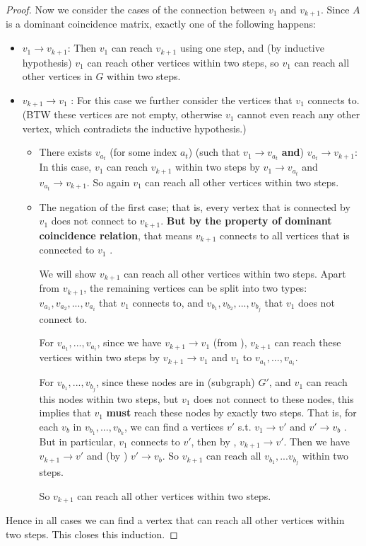 \begin{proof}
Now we consider the cases of the connection between \(v_1\) and \(v_{k + 1}\).
Since \(A\) is a dominant coincidence matrix, exactly one of the following happens:
\begin{itemize}
\item \(v_1 \to v_{k + 1}\):
    Then \(v_1\) can reach \(v_{k + 1}\) using one step, and (by inductive hypothesis) \(v_1\) can reach other vertices within two steps, so \(v_1\) can reach all other vertices in \(G\) within two steps.
\item \(v_{k + 1} \to v_1\) :
    For this case we further consider the vertices that \(v_1\) connects to.
    (BTW these vertices are not empty, otherwise \(v_1\) cannot even reach any other vertex, which contradicts the inductive hypothesis.)
    \begin{itemize}
    \item There exists \(v_{a_t}\) (for some index \(a_t\)) (such that \(v_1 \to v_{a_t}\) \textbf{and}) \(v_{a_t} \to v_{k + 1}\):
        In this case, \(v_1\) can reach \(v_{k + 1}\) within two steps by \(v_1 \to v_{a_t}\) and \(v_{a_t} \to v_{k + 1}\).
        So again \(v_1\) can reach all other vertices within two steps.
    \item The negation of the first case; that is, every vertex that is connected by \(v_1\) does not connect to \(v_{k + 1}\).
        \textbf{But by the property of dominant coincidence relation}, that means \(v_{k + 1}\) connects to all vertices that is connected to \(v_1\) .
        
        We will show \(v_{k + 1}\) can reach all other vertices within two steps.
        Apart from \(v_{k + 1}\), the remaining vertices can be split into two types: \(v_{a_1}, v_{a_2}, ..., v_{a_i}\) that \(v_1\) connects to, and \(v_{b_1}, v_{b_2}, ..., v_{b_j}\) that \(v_1\) does not connect to.
        
        For \(v_{a_1}, ..., v_{a_i}\), since we have \(v_{k + 1} \to v_1\) (from ), \(v_{k + 1}\) can reach these vertices within two steps by \(v_{k + 1} \to v_1\) and \(v_1\) to \(v_{a_1}, ..., v_{a_i}\).
        
        For \(v_{b_1}, ..., v_{b_j}\), since these nodes are in (subgraph) \(G'\), and \(v_1\) can reach this nodes within two steps, but \(v_1\) does not connect to these nodes, this implies that \(v_1\) \textbf{must} reach these nodes by exactly two steps.
        That is, for each \(v_b\) in \(v_{b_1}, ..., v_{b_k}\), we can find a vertices \(v'\) s.t. \(v_1 \to v'\) and \(v' \to v_b\) .
        But in particular, \(v_1\) connects to \(v'\), then by , \(v_{k + 1} \to v'\).
        Then we have \(v_{k + 1} \to v'\) and (by ) \(v' \to v_b\).
        So \(v_{k + 1}\) can reach all \(v_{b_1}, ... v_{b_j}\) within two steps.
        
        So \(v_{k + 1}\) can reach all other vertices within two steps.
    \end{itemize}
\end{itemize}
Hence in all cases we can find a vertex that can reach all other vertices within two steps.
This closes this induction.
\end{proof}

